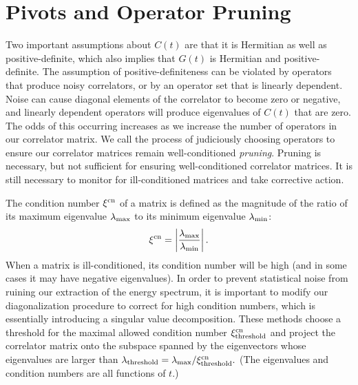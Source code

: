 \section{Pivots and Operator Pruning}\label{sec:pivots}
Two important assumptions about $C(t)$ are that it is Hermitian as well as positive-definite, which also implies that $G(t)$ is Hermitian and positive-definite. The assumption of positive-definiteness can be violated by operators that produce noisy correlators, or by an operator set that is linearly dependent. Noise can cause diagonal elements of the correlator to become zero or negative, and linearly dependent operators will produce eigenvalues of $C(t)$ that are zero. The odds of this occurring increases as we increase the number of operators in our correlator matrix. We call the process of judiciously choosing operators to ensure our correlator matrices remain well-conditioned \emph{pruning}. Pruning is necessary, but not sufficient for ensuring well-conditioned correlator matrices. It is still necessary to monitor for ill-conditioned matrices and take corrective action.

The condition number $\xi^{\rm{cn}}$ of a matrix is defined as the magnitude of the ratio of its maximum eigenvalue $\lambda_{\rm{max}}$ to its minimum eigenvalue $\lambda_{\rm{min}}$:
\begin{equation}
    \xi^{\rm{cn}} = \left|\frac{\lambda_{\rm{max}}}{\lambda_{\rm{min}}}\right|.
\end{equation}
When a matrix is ill-conditioned, its condition number will be high (and in some cases it may have negative eigenvalues). In order to prevent statistical noise from ruining our extraction of the energy spectrum, it is important to modify our diagonalization procedure to correct for high condition numbers, which is essentially introducing a singular value decomposition. These methods choose a threshold for the maximal allowed condition number $\xi^{\rm{cn}}_{\rm{threshold}}$ and project the correlator matrix onto the subspace spanned by the eigenvectors whose eigenvalues are larger than $\lambda_{\rm{threshold}} = \lambda_{\rm{max}}/\xi^{\rm{cn}}_{\rm{threshold}}.$ (The eigenvalues and condition numbers are all functions of $t$.)

